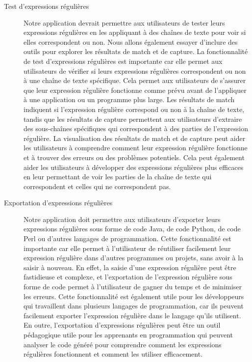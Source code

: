 \documentclass{article}
\begin{document}
\begin{description}
\item[Test d'expressions régulières] Notre application devrait permettre aux utilisateurs de tester leurs expressions régulières en les appliquant à des chaînes de texte pour voir si elles correspondent ou non. Nous allons également essayer d’inclure des outils pour explorer les résultats de match et de capture. La fonctionnalité de test d'expressions régulières est importante car elle permet aux utilisateurs de vérifier si leurs expressions régulières correspondent ou non à une chaîne de texte spécifique. Cela permet aux utilisateurs de s'assurer que leur expression régulière fonctionne comme prévu avant de l'appliquer à une application ou un programme plus large. Les résultats de match indiquent si l'expression régulière correspond ou non à la chaîne de texte, tandis que les résultats de capture permettent aux utilisateurs d'extraire des sous-chaînes spécifiques qui correspondent à des parties de l'expression régulière. La visualisation des résultats de match et de capture peut aider les utilisateurs à comprendre comment leur expression régulière fonctionne et à trouver des erreurs ou des problèmes potentiels. Cela peut également aider les utilisateurs à développer des expressions régulières plus efficaces en leur permettant de voir les parties de la chaîne de texte qui correspondent et celles qui ne correspondent pas.

\item[Exportation d'expressions régulières] Notre application doit permettre aux utilisateurs d'exporter leurs expressions régulières sous forme de code Java, de code Python, de code Perl ou d'autres langages de programmation. Cette fonctionnalité est importante car elle permet à l'utilisateur de réutiliser facilement leur expression régulière dans d'autres programmes ou projets, sans avoir à la saisir à nouveau.
En effet, la saisie d'une expression régulière peut être fastidieuse et complexe, et l'exportation de l'expression régulière sous forme de code permet à l'utilisateur de gagner du temps et de minimiser les erreurs. Cette fonctionnalité est également utile pour les développeurs qui travaillent dans plusieurs langages de programmation, car ils peuvent facilement exporter l'expression régulière dans le langage qu'ils utilisent.
En outre, l'exportation d'expressions régulières peut être un outil pédagogique utile pour les apprenants en programmation qui peuvent analyser le code généré pour comprendre comment les expressions régulières fonctionnent et comment les utiliser efficacement.


\end{description}
\end{document}
